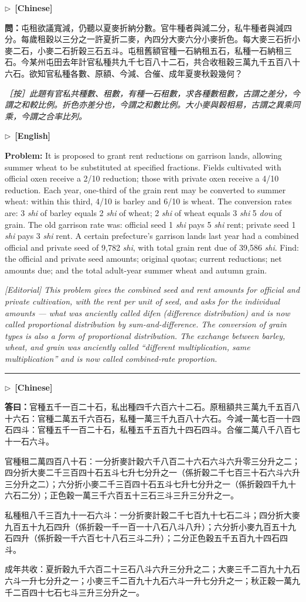 \documentclass[10pt,a4paper]{article}
\newcommand{\longline}{\par\noindent\rule{\textwidth}{0.4pt}\par}
\newcommand{\CNmarker}{\noindent\textcolor{cnlabel}{$\triangleright$\ \textbf{[Chinese]}}\par}
\newcommand{\ENmarker}{\noindent\textcolor{enlabel}{$\triangleright$\ \textbf{[English]}}\par}
\newcommand{\Question}[1]{\par\noindent\textbf{\color{problemcolor}問：}#1\par}
\newcommand{\Answer}[1]{\par\noindent\textbf{\color{answercolor}答曰：}#1\par}
\newcommand{\EditorialNote}[1]{\par\noindent\textit{［按］#1}\par}
\newcommand{\QuestionEn}[1]{\par\noindent\textbf{\color{problemcolor}Problem:} #1\par}
\newcommand{\EditorialNoteEn}[1]{\par\noindent\textit{[Editorial] #1}\par}
\begin{document}
\CNmarker
\Question{屯租欲議寬減，仍聽以夏麥折納分數。官牛種者與減二分，私牛種者與減四分。每歲租穀以三分之一許夏折二麥，內四分大麥六分小麥折色。每大麥三石折小麥二石，小麥二石折穀三石五斗。屯租舊額官種一石納租五石，私種一石納租三石。今某州屯田去年計官私種共九千七百八十二石，共合收租穀三萬九千五百八十六石。欲知官私種各數、原額、今減、合催、成年夏麥秋穀幾何？}

\EditorialNote{此題有官私共種數、租數，有種一石租數，求各種數租數，古謂之差分，今謂之和較比例。折色亦差分也，今謂之和數比例。大小麥與穀相易，古謂之異乘同乘，今謂之合率比列。}

\ENmarker
\QuestionEn{It is proposed to grant rent reductions on garrison lands, allowing summer wheat to be substituted at specified fractions. Fields cultivated with official oxen receive a 2/10 reduction; those with private oxen receive a 4/10 reduction. Each year, one-third of the grain rent may be converted to summer wheat: within this third, 4/10 is barley and 6/10 is wheat. The conversion rates are: 3 \textit{shi} of barley equals 2 \textit{shi} of wheat; 2 \textit{shi} of wheat equals 3 \textit{shi} 5 \textit{dou} of grain. The old garrison rate was: official seed 1 \textit{shi} pays 5 \textit{shi} rent; private seed 1 \textit{shi} pays 3 \textit{shi} rent. A certain prefecture's garrison lands last year had a combined official and private seed of 9,782 \textit{shi}, with total grain rent due of 39,586 \textit{shi}. Find: the official and private seed amounts; original quotas; current reductions; net amounts due; and the total adult-year summer wheat and autumn grain.}

\EditorialNoteEn{This problem gives the combined seed and rent amounts for official and private cultivation, with the rent per unit of seed, and asks for the individual amounts --- what was anciently called \textit{difen} (difference distribution) and is now called proportional distribution by sum-and-difference. The conversion of grain types is also a form of proportional distribution. The exchange between barley, wheat, and grain was anciently called ``different multiplication, same multiplication'' and is now called combined-rate proportion.}

\longline

\CNmarker
\Answer{官種五千一百二十石，私出種四千六百六十二石。原租額共三萬九千五百八十六石：官種二萬五千六百石，私種一萬三千九百八十六石。今減一萬七百一十四石四斗：官種五千一百二十石，私種五千五百九十四石四斗。合催二萬八千八百七十一石六斗。

官種租二萬四百八十石：一分折麥計穀六千八百二十六石六斗六升零三分升之二；四分折大麥二千三百四十石五斗七升七分升之一（係折穀二千七百三十石六斗六升三分升之二）；六分折小麥二千三百四十石五斗七升七分升之一（係折穀四千九十六石二分）；正色穀一萬三千六百五十三石三斗三升三分升之一。

私種租八千三百九十一石六斗：一分折麥計穀二千七百九十七石二斗；四分折大麥九百五十九石四升（係折穀一千一百一十八石八斗八升）；六分折小麥九百五十九石四升（係折穀一千六百七十八石三斗二升）；二分正色穀五千五百九十四石四斗。

成年共收：夏折穀九千六百二十三石八斗六升三分升之二；大麥三千二百九十九石六斗一升七分升之一；小麥三千二百九十九石六斗一升七分升之一；秋正穀一萬九千二百四十七石七斗三升三分升之一。}
\end{document}

